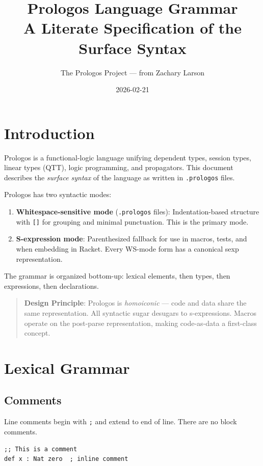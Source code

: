\documentclass[11pt]{article}
\author{The Prologos Project — from Zachary Larson}
\date{2026-02-21}
\title{Prologos Language Grammar\\\medskip
\large A Literate Specification of the Surface Syntax}
\begin{document}
\maketitle
\setcounter{tocdepth}{3}
\tableofcontents

\section{Introduction}
\label{sec:org9942054}

Prologos is a functional-logic language unifying dependent types, session types,
linear types (QTT), logic programming, and propagators. This document describes
the \emph{surface syntax} of the language as written in \texttt{.prologos} files.

Prologos has two syntactic modes:

\begin{enumerate}
\item \textbf{Whitespace-sensitive mode} (\texttt{.prologos} files): Indentation-based structure
with \texttt{[]} for grouping and minimal punctuation. This is the primary mode.
\item \textbf{S-expression mode}: Parenthesized fallback for use in macros, tests, and
when embedding in Racket. Every WS-mode form has a canonical sexp
representation.
\end{enumerate}

The grammar is organized bottom-up: lexical elements, then types, then
expressions, then declarations.

\begin{quote}
\textbf{Design Principle}: Prologos is \emph{homoiconic} --- code and data share the same
representation. All syntactic sugar desugars to s-expressions. Macros operate on
the post-parse representation, making code-as-data a first-class concept.
\end{quote}
\section{Lexical Grammar}
\label{sec:org90a0a46}

\subsection{Comments}
\label{sec:org903ac13}

Line comments begin with \texttt{;} and extend to end of line. There are no block
comments.

\begin{verbatim}
;; This is a comment
def x : Nat zero  ; inline comment
\end{verbatim}
\end{document}
